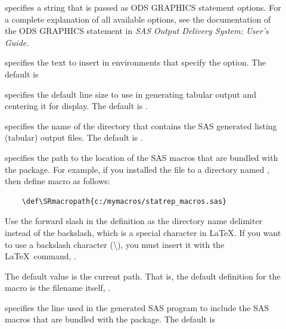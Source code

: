 \documentclass[article,oneside]{memoir}
\begin{document}
\begin{description}
    \item[] specifies a string that is passed as
    ODS GRAPHICS statement options. For a complete explanation of all available options,
    see the documentation of the ODS GRAPHICS statement in
    \textit{SAS Output Delivery System: User's Guide}.

    \item[] specifies the text to insert in
     environments that specify
     the  option. The default is 

    \item[] specifies the default line size to use in generating tabular
    output and centering it for display. The default is .

     \item[] specifies the name of the directory that contains the SAS
     generated listing (tabular) output files. The default is .

     \item[] specifies the path to the location of the
     SAS macros that are bundled with the  package.
     For example, if  you installed the  file to a directory named
    ,
    then define macro  as follows:
    \begin{verbatim}
    \def\SRmacropath{c:/mymacros/statrep_macros.sas}
    \end{verbatim}

   Use the forward slash in the definition
   as the directory name delimiter instead of the backslash, which is a special
   character in \LaTeX. If you want to use a backslash character (\textbackslash), you
   must insert it with the \LaTeX\ command, .

   The default value is the current path. That is, the default
   definition for the  macro is the filename itself, .

     \item[] specifies the line used in the generated SAS program to
     include the SAS macros that are bundled with the  package.
     The default is\\~


\end{description}
\end{document}
